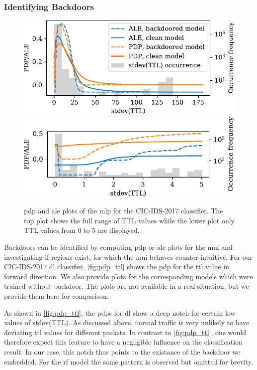 \documentclass[10pt,sigconf,letterpaper,dvipsnames]{acmart}
\begin{document}
\subsubsection{Identifying Backdoors}
\begin{figure}[h]
\includegraphics[width=\columnwidth]{figures/pdpale2017nn.pdf}
\includegraphics[width=\columnwidth]{figures/pdpale2017nn_zoom.pdf}
\caption{\gls{pdp} and \gls{ale} plots of the \gls{mlp} for the CIC-IDS-2017 classifier. The top plot shows the full range of TTL values while the lower plot only TTL values from 0 to 5 are displayed.}
\label{fig:pdp_ttl}
\end{figure}
Backdoors can be identified by computing \gls{pdp} or \gls{ale} plots for the \gls{mui} and investigating if regions exist, for which the \gls{mui} behaves counter-intuitive. For our CIC-IDS-2017 \gls{dl} classifier, \autoref{fig:pdp_ttl} shows the \gls{pdp} for the \gls{ttl} value in forward direction. We also provide plots for the corresponding models which were trained without backdoor. The plots are not available in a real situation, but we provide them here for comparison.

As shown in \autoref{fig:pdp_ttl}, the \glspl{pdp} for \gls{dl} show a deep notch for certain low values of stdev(TTL). As discussed above, normal traffic is very unlikely to have deviating \gls{ttl} values for different packets. In contrast to \autoref{fig:pdp_ttl}, one would therefore expect this feature to have a negligible influence on the classification result. In our case, this notch thus points to the existance of the backdoor we embedded. For the \gls{rf} model the same pattern is observed but omitted for brevity. 
\end{document}

